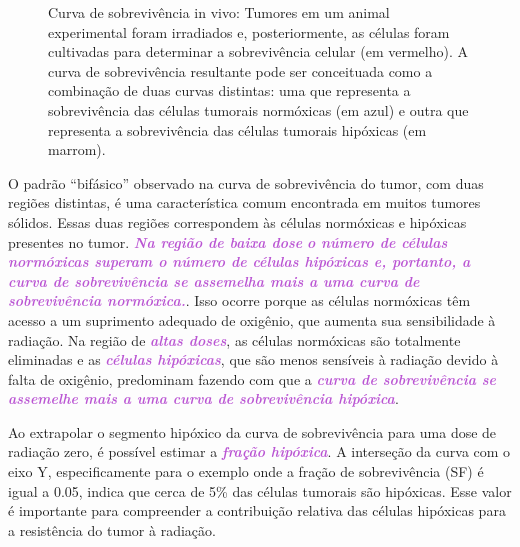 \documentclass[11pt,a4paper]{article}
\newcounter{exemplo}
\begin{document}
	\begin{figure}[h]
		\centering
		\caption{Curva de sobrevivência in vivo: Tumores em um animal experimental foram irradiados e, posteriormente, as células foram cultivadas para determinar a sobrevivência celular (em vermelho). A curva de sobrevivência resultante pode ser conceituada como a combinação de duas curvas distintas: uma que representa a sobrevivência das células tumorais normóxicas (em azul) e outra que representa a sobrevivência das células tumorais hipóxicas (em marrom).}
		\label{fig:medidaDiretaHipoxia}
	\end{figure}

	O padrão ``bifásico'' observado na curva de sobrevivência do tumor, com duas regiões distintas, é uma característica comum encontrada em muitos tumores sólidos. Essas duas regiões correspondem às células normóxicas e hipóxicas presentes no tumor. \textcolor{MediumOrchid}{\textbf{\textit{Na região de baixa dose}}} \textcolor{MediumOrchid}{\textbf{\textit{o número de células normóxicas superam o número de células hipóxicas e, portanto, a curva de sobrevivência se assemelha mais a uma curva de sobrevivência normóxica.}}}. Isso ocorre porque as células normóxicas têm acesso a um suprimento adequado de oxigênio, que aumenta sua sensibilidade à radiação. Na região de \textcolor{MediumOrchid}{\textbf{\textit{altas doses}}}, as células normóxicas são totalmente eliminadas e as \textcolor{MediumOrchid}{\textbf{\textit{células hipóxicas}}}, que são menos sensíveis à radiação devido à falta de oxigênio, predominam fazendo com que a \textcolor{MediumOrchid}{\textbf{\textit{curva de sobrevivência se assemelhe mais a uma curva de sobrevivência hipóxica}}}.

	Ao extrapolar o segmento hipóxico da curva de sobrevivência para uma dose de radiação zero, é possível estimar a \textcolor{MediumOrchid}{\textbf{\textit{fração hipóxica}}}. A interseção da curva com o eixo Y, especificamente para o exemplo onde a fração de sobrevivência (SF) é igual a 0.05, indica que cerca de 5\% das células tumorais são hipóxicas. Esse valor é importante para compreender a contribuição relativa das células hipóxicas para a resistência do tumor à radiação.
\end{document}

